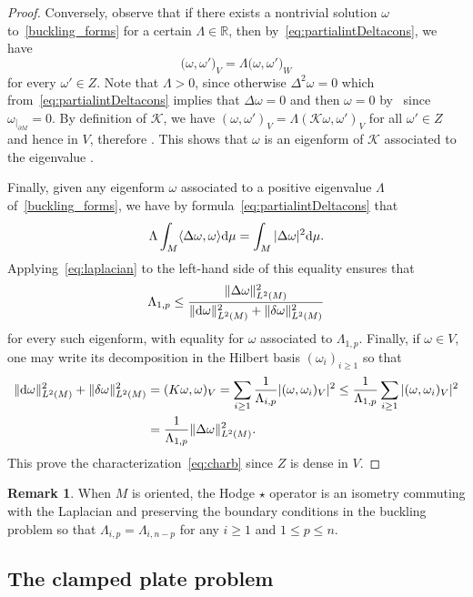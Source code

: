 \documentclass[10pt,a4paper]{amsart}
\newcommand{\R}{{\mathbb R}}
\numberwithin{equation}{section}
\theoremstyle{definition}
\newtheorem{Remark}[Theorem]{Remark}
\begin{document}
\begin{proof}
Conversely, observe that if there exists a nontrivial solution $\omega$ to~\eqref{buckling_forms} for a certain $\Lambda\in\R$, then by~\eqref{eq:partialintDeltacons}, we have
\[
\bigl(\omega,\omega'\bigr)_V=\Lambda\bigl(\omega,\omega'\bigr)_W
\]
for every $\omega'\in Z$. Note that $\Lambda>0$, since otherwise $\Delta^2\omega=0$ which from~\eqref{eq:partialintDeltacons} implies that $\Delta\omega=0$ and then $\omega=0$ by~\cite{Anne89} since $\omega_{|_{\partial M}}=0$.
By definition of $\mathcal{K}$, we have $(\omega,\omega')_V=\Lambda(\mathcal{K}\omega,\omega')_V$ for all ${\omega'\in Z}$ and hence in $V$, therefore . This shows that $\omega$ is an eigenform of $\mathcal{K}$ associated to the eigenvalue .

Finally, given any eigenform $\omega$ associated to a positive eigenvalue $\Lambda$ of~\eqref{buckling_forms}, we have by formula~\eqref{eq:partialintDeltacons} that
\[
\Lambda\int_M\langle\Delta\omega,\omega\rangle {\rm d}\mu=\int_M |\Delta \omega|^2 {\rm d}\mu.
\]
Applying~\eqref{eq:laplacian} to the left-hand side of this equality ensures that
\[
\Lambda_{1,p}\leq \frac{\|\Delta\omega\|_{L^2(M)}^2}{
\|{\rm d}\omega\|_{L^2(M)}^2+\|\delta\omega\|_{L^2(M)}^2}
\]
for every such eigenform, with equality for $\omega$ associated to $\Lambda_{1,p}$.
Finally, if $\omega\in V$, one may write its decomposition in the Hilbert basis $(\omega_i)_{i\geq 1}$ so that
\begin{align*}
\|{\rm d}\omega\|_{L^2(M)}^2+\|\delta\omega\|_{L^2(M)}^2 &=(K\omega,\omega)_V
=\sum_{i\geq 1}\frac{1}{\Lambda_{i,p}}|(\omega,\omega_i)_V|^2
 \leq \frac{1}{\Lambda_{1,p}}\sum_{i\geq 1}|(\omega,\omega_i)_V|^2\\
 &=\frac{1}{\Lambda_{ 1 ,p}}\|\Delta\omega\|_{L^2(M)}^2.
\end{align*}
This prove the characterization~\eqref{eq:charb} since $Z$ is dense in $V$.
\end{proof}

\begin{Remark}\label{SymmetryBuck}
When $M$ is oriented, the Hodge $\star$ operator is an isometry commuting with the Laplacian and preserving the boundary conditions in the buckling problem so that $\Lambda_{i,p}=\Lambda_{i,n-p}$ for any $i\geq 1$ and $1\leq p\leq n$.
\end{Remark}

\subsection{The clamped plate problem}
\end{document}
